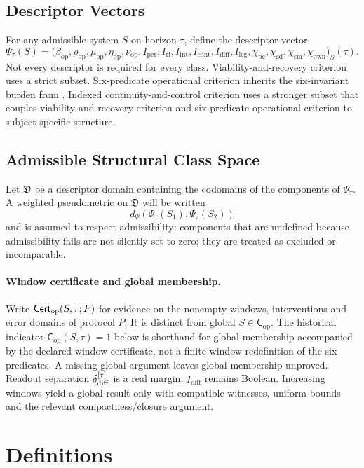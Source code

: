 \documentclass[11pt,a4paper]{article}
\theoremstyle{definition}
\newcommand{\Cop}{\mathsf{C}_{\mathrm{op}}}
\newcommand{\PsiVec}{\Psi}
\newcommand{\Iper}{I_{\mathrm{per}}}
\newcommand{\Iri}{I_{\mathrm{ri}}}
\newcommand{\Iint}{I_{\mathrm{int}}}
\newcommand{\Icont}{I_{\mathrm{cont}}}
\newcommand{\Idiff}{I_{\mathrm{diff}}}
\newcommand{\Ileg}{I_{\mathrm{leg}}}
\newcommand{\Bound}{\beta_{\mathrm{op}}}
\newcommand{\Persist}{\rho_{\mathrm{op}}}
\newcommand{\Maint}{\mu_{\mathrm{op}}}
\newcommand{\HistDep}{\eta_{\mathrm{op}}}
\newcommand{\Viab}{\nu_{\mathrm{op}}}
\newcommand{\Priv}{\chi_{\mathrm{pc}}}
\newcommand{\SelfDisc}{\chi_{\mathrm{sd}}}
\newcommand{\SelfModel}{\chi_{\mathrm{sm}}}
\newcommand{\Own}{\chi_{\mathrm{own}}}
\begin{document}
\subsection{Descriptor Vectors}
For any admissible system $S$ on horizon $\tau$, define the descriptor vector
\[
\PsiVec_\tau(S)
=
\bigl(
\Bound,
\Persist,
\Maint,
\HistDep,
\Viab,
\Iper,
\Iri,
\Iint,
\Icont,
\Idiff,
\Ileg,
\Priv,
\SelfDisc,
\SelfModel,
\Own
\bigr)_S(\tau).
\]
Not every descriptor is required for every class. Viability-and-recovery criterion uses a strict subset. Six-predicate operational criterion inherits the six-invariant burden from \cite{paper5}. Indexed continuity-and-control criterion uses a stronger subset that couples viability-and-recovery criterion and six-predicate operational criterion to subject-specific structure.

\subsection{Admissible Structural Class Space}
Let $\mathfrak{D}$ be a descriptor domain containing the codomains of the components of $\PsiVec_\tau$. A weighted pseudometric on $\mathfrak{D}$ will be written
\[
d_{\Psi}(\PsiVec_\tau(S_1),\PsiVec_\tau(S_2))
\]
and is assumed to respect admissibility: components that are undefined because admissibility fails are not silently set to zero; they are treated as excluded or incomparable.

\paragraph{Window certificate and global membership.}
Write $\mathsf{Cert}_{\rm op}(S,\tau;P)$ for evidence on the nonempty windows, interventions and error domains of protocol $P$. It is distinct from global $S\in\Cop$. The historical indicator $\Cop(S,\tau)=1$ below is shorthand for global membership accompanied by the declared window certificate, not a finite-window redefinition of the six predicates. A missing global argument leaves global membership unproved. Readout separation $\delta_{\rm diff}^{[\tau]}$ is a real margin; $\Idiff$ remains Boolean. Increasing windows yield a global result only with compatible witnesses, uniform bounds and the relevant compactness/closure argument.

\section{Definitions}\label{sec:definitions}
\end{document}
